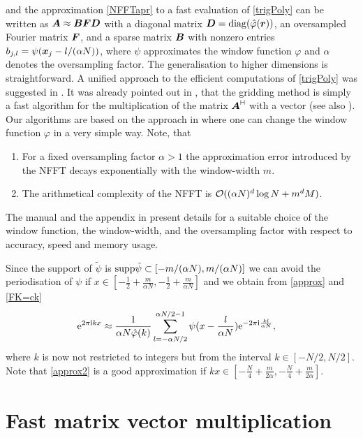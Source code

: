 \documentclass[journal]{IEEEtran}
\def\ti{\mbox{\scriptsize{\rm i}}}
\newcommand{\eip}[1]{{\rm e}^{ 2\pi{\ti} #1}}
\newcommand{\eim}[1]{{\rm e}^{-2\pi{\ti} #1}}
\newcommand{\zb}[1]{\mbox{\boldmath{${#1}$}}}
\newcommand{\diag}{{\rm diag}}
\newcommand{\adj}{{\vdash \hspace*{-1.72mm} \dashv}}
\numberwithin{equation}{section}
\numberwithin{table}{section}
\numberwithin{figure}{section}
\begin{document}
and the approximation \eqref{NFFTapr} to a fast
evaluation of \eqref{trigPoly} can
be written as 
$\zb A \approx \zb B \zb F \zb D$ with a diagonal matrix $\zb
D=\diag(\hat \varphi(\zb r))$,
an oversampled Fourier matrix $\zb F$, and
a sparse matrix $\zb B$
with nonzero entries $b_{j,l}=\psi (\zb x_j - l/ (\alpha N))$, where
$\psi$ approximates the window  function $\varphi$ and $\alpha$
denotes the oversampling factor. The generalisation to higher
dimensions is straightforward. A unified approach to the
efficient computations of \eqref{trigPoly} was suggested in \cite{st97,
  postta01}. It was already pointed out in \cite{postta01,SaBeCo01},
that the gridding 
method is simply a fast algorithm for the multiplication of the matrix
$\zb A^{\adj}$ with a vector (see also \cite{KnKuPo}).
Our algorithms are based on the approach in \cite{postta01} where one can change 
the window function $\varphi$ in a very simple way. Note, that
\begin{enumerate}
\item For a fixed oversampling factor $\alpha >1$ the approximation error introduced by the NFFT
decays exponentially with the window-width $m$.
\item The arithmetical complexity of the NFFT is ${\cal O} ((\alpha N)^d\log N+m^d M)$. 
\end{enumerate}
The manual \cite{kupo04b} and the appendix in \cite{post02} present details
for a suitable choice of the window function, the window-width, and the
oversampling factor with respect to accuracy, speed and memory usage.


Since the support of $\tilde\psi$ is ${\rm supp} \tilde\psi\subset
[-m/(\alpha N), m/(\alpha N)]$ we can avoid the periodisation of $\psi$ 
if $x\in[-\frac{1}{2}+\frac{m}{\alpha N},-\frac{1}{2}+\frac{m}{\alpha N}]$ 
and we obtain from \eqref{approx} and \eqref{FK=ck}
\begin{equation} \label{approx2}
\eip{kx}
\approx
\frac{1}{\alpha N \hat\varphi(k)}
\sum_{l=-\alpha N/2}^{\alpha N/2-1} \psi (x-\frac{l}{\alpha N})
\eim{\frac{kl}{\alpha N}},\quad
\end{equation}
where $k$ is now not restricted to integers but from the interval
$k\in [-N/2,N/2]$.
Note that \eqref{approx2} is a good approximation if 
$kx\in[-\frac{N}{4}+\frac{m}{2\alpha},-\frac{N}{4}+\frac{m}{2\alpha}]$.


\section{Fast matrix vector multiplication}\label{Sec:NFFT}
 
\end{document}
